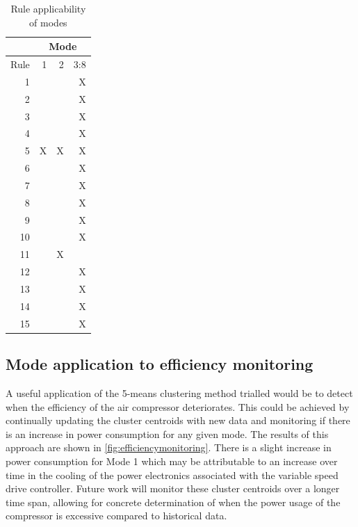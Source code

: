 \begin{table}[htbp]
  \centering
  \caption{Rule applicability of modes}
    \begin{tabular}{r|rrr}
    \toprule
          & \multicolumn{3}{c}{Mode} \\
    \midrule
     Rule & 1     & 2     & 3:8 \\
     \midrule
    1     &       &       & X \\
    2     &       &       & X \\
    3     &       &       & X \\
    4     &       &       & X \\
    5     & X     & X     & X \\
    6     &       &       & X \\
    7     &       &       & X \\
    8     &       &       & X \\
    9     &       &       & X \\
    10    &       &       & X \\
    11    &       & X     &  \\
    12    &       &       & X \\
    13    &       &       & X \\
    14    &       &       & X \\
    15    &       &       & X \\
    \bottomrule
    \end{tabular}%
  \label{tab:modeapplication}%
\end{table}%


\subsection{Mode application to efficiency monitoring}
\label{subsec:modeefficiency}
A useful application of the 5-means clustering method trialled would be to detect when the efficiency of the air compressor deteriorates. This could be achieved by continually updating the cluster centroids with new data and monitoring if there is an increase in power consumption for any given mode. The results of this approach are shown in \autoref{fig:efficiencymonitoring}. There is a slight increase in power consumption for Mode 1 which may be attributable to an increase over time in the cooling of the power electronics associated with the variable speed drive controller. Future work will monitor these cluster centroids over a longer time span, allowing for concrete determination of when the power usage of the compressor is excessive compared to historical data.

